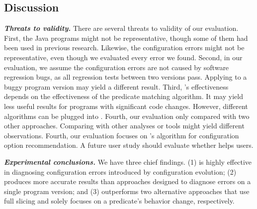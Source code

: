 \subsection{Discussion}

\noindent \textbf{\textit{Threats to validity.}}
There are several threats to validity of our evaluation.
First, the \subjnum Java programs might not be representative, though some of them had been
used in previous research. Likewise, the
\errornum configuration errors might not be representative, even though we
evaluated every error we found. 
Second, in our evaluation, we assume the configuration errors
are not caused by software regression bugs, as all regression
tests between two versions pass. Applying \ourtool to a buggy
program version may yield a different result.
Third, \ourtool's effectiveness depends on the effectiveness of the
predicate matching algorithm. It may yield less
useful results for programs with significant code changes.
However, different algorithms can be plugged into \ourtool.
Fourth, our evaluation only compared \ourtool with two other
approaches. Comparing with other analyses or tools might yield
different observations.
Fourth, our evaluation focuses on \ourtool's algorithm for
configuration option recommendation. A future user study should
evaluate whether \ourtool helps users.

\vspace{1mm}

\noindent \textbf{\textit{Experimental conclusions.}}
We have three chief findings. (1) \ourtool is highly effective
in diagnosing configuration errors introduced by configuration
evolution; (2) \ourtool produces more accurate results than
approaches designed to diagnose errors on a single program version;
and (3) \ourtool outperforms two alternative approaches
that use full slicing and solely focuses on a predicate's
behavior change, respectively.

